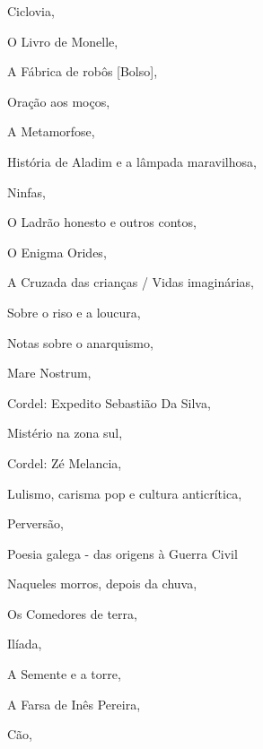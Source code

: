 \begin{multicols}{2}
\begin{enumerate}
{\item Ciclovia, {}
\item O Livro de Monelle, {}
\item A Fábrica de robôs [Bolso], {}
\item Oração aos moços, {}
\item A Metamorfose, {}
\item História de Aladim e a lâmpada maravilhosa, {}
\item Ninfas, {}
\item O Ladrão honesto e outros contos, {}
\item O Enigma Orides, {}
\item A Cruzada das crianças / Vidas imaginárias, {}
\item Sobre o riso e a loucura, {}
\item Notas sobre o anarquismo, {}
\item Mare Nostrum, {}
\item Cordel: Expedito Sebastião Da Silva, {}
\item Mistério na zona sul, {}
\item Cordel: Zé Melancia, {}
\item Lulismo, carisma pop e cultura anticrítica, {}
\item Perversão, {}
\item Poesia galega - das origens à Guerra Civil
\item Naqueles morros, depois da chuva, {}
\item Os Comedores de terra, {}
\item Ilíada, {}
\item A Semente e a torre, {}
\item A Farsa de Inês Pereira, {}
\item Cão, {}
}
\end{enumerate}
\end{multicols}
